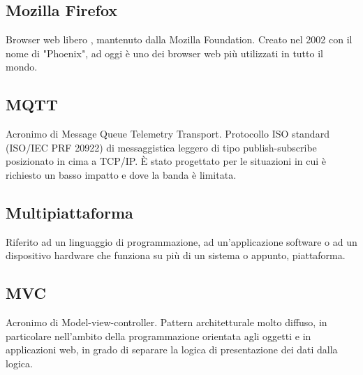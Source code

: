 \subsection*{Mozilla Firefox}
Browser web libero , mantenuto dalla Mozilla Foundation. Creato nel 2002 con il nome di "Phoenix", ad oggi è uno dei browser web più utilizzati in tutto il mondo.

\subsection*{MQTT}
Acronimo di Message Queue Telemetry Transport. Protocollo ISO standard (ISO/IEC PRF 20922) di messaggistica leggero di tipo publish-subscribe posizionato in cima a TCP/IP. È stato progettato per le situazioni in cui è richiesto un basso impatto e dove la banda è limitata. 

\subsection*{Multipiattaforma}
Riferito ad un linguaggio di programmazione, ad un'applicazione software o ad un dispositivo hardware che funziona su più di un sistema o appunto, piattaforma.

\subsection*{MVC}
Acronimo di Model-view-controller. Pattern architetturale molto diffuso, in particolare nell'ambito della programmazione orientata agli oggetti e in applicazioni web, in grado di separare la logica di presentazione dei dati dalla logica.
